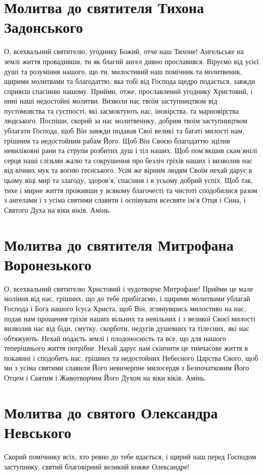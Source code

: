 \documentclass[chapters.tex]{subfiles}
\begin{document}
\section{Молитва до святителя Тихона Задонського}
О, всехвальний святителю, угоднику Божий, отче наш Тихоне! Ангельське на землі життя провадивши, ти як благий ангел дивно прославився. Віруємо від усієї душі та розуміння нашого, що ти, милостивий наш помічник та молитвеник, щирими молитвами та благодаттю, яка тобі від Господа щедро подається, завжди сприяєш спасінню нашому. Прийми, отже, прославлений угоднику Христовий, і нині наші недостойні молитви. Визволи нас твоїм заступництвом від пустомовства та суєтності, які засмоктують нас, іновірства, та марновірства людського. Поспіши, скорий за нас молитвенику, добрим твоїм заступництвом ублагати Господа, щоб Він завжди подавав Свої великі та багаті милості нам, грішним та недостойним рабам Його. Щоб Він Своєю благодаттю зцілив невиліковні рани та струпи розбитих душ і тіл наших. Щоб пом’якшив скам’янілі серця наші слізьми жалю та сокрушення про безліч гріхів наших і визволив нас від вічних мук та вогню геєнського. Усім же вірним людям Своїм нехай дарує в цьому віці мир та злагоду, здоров’я, спасіння і в усьому добрий успіх. Щоб так, тихе і мирне життя проживши у всякому благочесті та чистоті сподобилися разом з ангелами і з усіма святими славити і оспівувати всесвяте ім’я Отця і Сина, і Святого Духа на віки віків. Амінь.

\section{Молитва до святителя Митрофана Воронезького}
О, всехвальний святителю Христовий і чудотворче Митрофане! Прийми це мале моління від нас, грішних, що до тебе прибігаємо, і щирими молитвами ублагай Господа і Бога нашого Ісуса Христа, щоб Він, зглянувшись милостиво на нас, подав нам прощення гріхів наших вільних та невільних і з великої Своєї милості визволив нас від біди, смутку, скорботи, недугів душевних та тілесних, які нас обтяжують. Нехай подасть землі і плодоносність та все, що для нашого теперішнього життя потрібне. Нехай дарує нам скінчити це тимчасове життя в покаянні і сподобить нас, грішних та недостойних Небесного Царства Свого, щоб ми з усіма святими славили Його невичерпне милосердя з Безпочатковим Його Отцем і Святим і Животворчим Його Духом на віки віків. Амінь.

\section{Молитва до святого Олександра Невського}
Скорий помічнику всіх, хто ревно до тебе вдається, і щирий наш перед Господом заступнику, святий благовірний великий княже Олександре!
\end{document}
